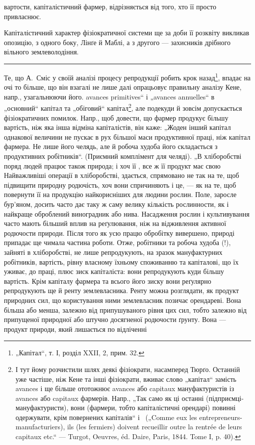 \parcont{}  %
вартости, капіталістичний фармер, відрізняється від того, хто її просто
привласнює.

Капіталістичний характер фізіократичної системи ще за доби її розквіту
викликав опозицію, з одного боку, Лінґе й Маблі, а з другого —
захисників дрібного вільного землеволодіння.
\pfbreak
Те, що А.~Сміс у своїй аналізі процесу репродукції робить крок
назад\footnote{
„Капітал“, т. І, розділ XXII, 2, прим. 32.
}, впадає на очі то більше, що він взагалі не лише далі опрацьовує
правильну аналізу Кене, напр., узагальнюючи його. avances primitives“
і „avances annuelles“ в „основний“ капітал та „обіговий“
капітал\footnote{
І тут йому розчистили шлях деякі фізіократи, насамперед Тюрґо. Останній
уже частіше, ніж Кене та інші фізіократи, вживає слово „капітал“ замість avances
і ще більше ототожнює avances або capitaux мануфактуристів із avances або
capitaux фармерів. Напр., „Так само як ці останні (підприємці-мануфактуристи),
вони (фармери, тобто капіталістичні орендарі) повинні одержувати, крім повернених
капіталів“ і~ („Comme eux les entrepreneurs-manufacturiers), ils (les fermiers)
doivent recueillir outre la rentrée de leurs capitaux etc.“ — Turgot, Oeuvres, éd.
Daire, Paris, 1844. Tome I, p. 40).
}, але подекуди й зовсім допускається фізіократичних помилок.
Напр., щоб довести, що фармер продукує більшу вартість, ніж яка інша
відміна капіталістів, він каже: „Жоден інший капітал однакової величини
не пускає в рух більшої маси продуктивної праці, ніж капітал фармера.
Не лише його челядь, але й робоча худоба його складається з продуктивних
робітників“. (Приємний комплімент для челяді). „В хліборобстві
поряд людей працює також природа; і хоч її , все ж її продукт має свою 
Найважливіші операції в хліборобстві, здається, спрямовано не так на те,
щоб підвищити природну родючість, хоч вони спричиняють і це, — як
на те, щоб повернути її на продукцію найкорисніших для людини рослин.
Поле, заросле бур’яном, досить часто дає таку ж саму велику
кількість рослинности, як і найкраще оброблений виноградник або
нива. Насадження рослин і культивування часто мають більший вплив на
реґулювання, ніж на відживлення активної родючости природи. Після
того як усю працю обробітку вивершено, природі припадає ще чимала
частина роботи. Отже, робітники та робоча худоба (!), зайняті в хліборобстві,
не лише репродукують, на зразок мануфактурних робітників,
вартість, рівну власному їхньому споживанню та капіталові, що їх уживає,
до праці, плюс зиск капіталіста: вони репродукують куди більшу вартість.
Крім капіталу фармера та всього його зиску вони реґулярно репродукують
ще й ренту землевласника. Ренту можна розглядати, як продукт
природних сил, що користування ними землевласник позичає орендареві.
Вона більша або менша, залежно від припушуваного рівня цих сил,
тобто залежно від припущеної природної або штучно досягненої родючости
ґрунту. Вона — продукт природи, який лишається по відліченні
\parbreak{}  %
